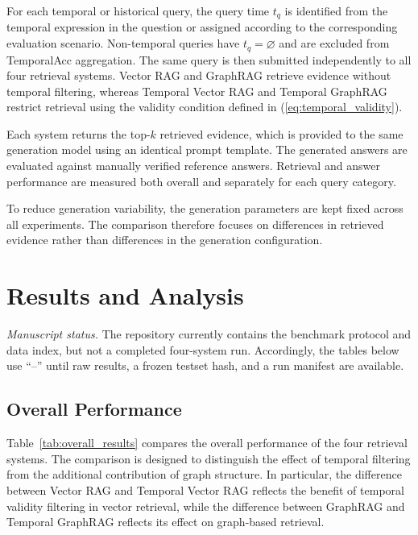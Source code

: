 \documentclass[conference]{IEEEtran}
\numberwithin{equation}{section}
\begin{document}
For each temporal or historical query, the query time $t_q$ is identified from the temporal expression in the question or assigned according to the corresponding evaluation scenario. Non-temporal queries have $t_q=\varnothing$ and are excluded from TemporalAcc aggregation. The same query is then submitted independently to all four retrieval systems. Vector RAG and GraphRAG retrieve evidence without temporal filtering, whereas Temporal Vector RAG and Temporal GraphRAG restrict retrieval using the validity condition defined in (\ref{eq:temporal_validity}).

Each system returns the top-$k$ retrieved evidence, which is provided to the same generation model using an identical prompt template. The generated answers are evaluated against manually verified reference answers. Retrieval and answer performance are measured both overall and separately for each query category.

To reduce generation variability, the generation parameters are kept fixed across all experiments. The comparison therefore focuses on differences in retrieved evidence rather than differences in the generation configuration. 

\section{Results and Analysis}
\textit{Manuscript status.} The repository currently contains the benchmark protocol and data index, but not a completed four-system run. Accordingly, the tables below use ``--'' until raw results, a frozen testset hash, and a run manifest are available.\par


\subsection{Overall Performance}

Table~\ref{tab:overall_results} compares the overall performance of the four retrieval systems. The comparison is designed to distinguish the effect of temporal filtering from the additional contribution of graph structure. In particular, the difference between Vector RAG and Temporal Vector RAG reflects the benefit of temporal validity filtering in vector retrieval, while the difference between GraphRAG and Temporal GraphRAG reflects its effect on graph-based retrieval.
\end{document}

